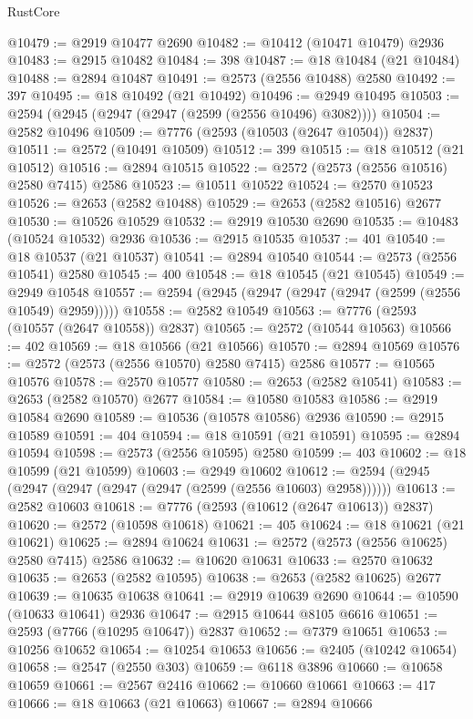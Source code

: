 \begin{lexlean}{RustCore}
\begin{coremodule}
@10479 := @2919 @10477 @2690
@10482 := @10412 (@10471 @10479) @2936
@10483 := @2915 @10482
@10484 := 398
@10487 := @18 @10484 (@21 @10484)
@10488 := @2894 @10487
@10491 := @2573 (@2556 @10488) @2580
@10492 := 397
@10495 := @18 @10492 (@21 @10492)
@10496 := @2949 @10495
@10503 := @2594 (@2945 (@2947 (@2947 (@2599 (@2556 @10496) @3082))))
@10504 := @2582 @10496
@10509 := @7776 (@2593 (@10503 (@2647 @10504)) @2837)
@10511 := @2572 (@10491 @10509)
@10512 := 399
@10515 := @18 @10512 (@21 @10512)
@10516 := @2894 @10515
@10522 := @2572 (@2573 (@2556 @10516) @2580 @7415) @2586
@10523 := @10511 @10522
@10524 := @2570 @10523
@10526 := @2653 (@2582 @10488)
@10529 := @2653 (@2582 @10516) @2677
@10530 := @10526 @10529
@10532 := @2919 @10530 @2690
@10535 := @10483 (@10524 @10532) @2936
@10536 := @2915 @10535
@10537 := 401
@10540 := @18 @10537 (@21 @10537)
@10541 := @2894 @10540
@10544 := @2573 (@2556 @10541) @2580
@10545 := 400
@10548 := @18 @10545 (@21 @10545)
@10549 := @2949 @10548
@10557 := @2594 (@2945 (@2947 (@2947 (@2947 (@2599 (@2556 @10549) @2959)))))
@10558 := @2582 @10549
@10563 := @7776 (@2593 (@10557 (@2647 @10558)) @2837)
@10565 := @2572 (@10544 @10563)
@10566 := 402
@10569 := @18 @10566 (@21 @10566)
@10570 := @2894 @10569
@10576 := @2572 (@2573 (@2556 @10570) @2580 @7415) @2586
@10577 := @10565 @10576
@10578 := @2570 @10577
@10580 := @2653 (@2582 @10541)
@10583 := @2653 (@2582 @10570) @2677
@10584 := @10580 @10583
@10586 := @2919 @10584 @2690
@10589 := @10536 (@10578 @10586) @2936
@10590 := @2915 @10589
@10591 := 404
@10594 := @18 @10591 (@21 @10591)
@10595 := @2894 @10594
@10598 := @2573 (@2556 @10595) @2580
@10599 := 403
@10602 := @18 @10599 (@21 @10599)
@10603 := @2949 @10602
@10612 := @2594 (@2945 (@2947 (@2947 (@2947 (@2947 (@2599 (@2556 @10603) @2958))))))
@10613 := @2582 @10603
@10618 := @7776 (@2593 (@10612 (@2647 @10613)) @2837)
@10620 := @2572 (@10598 @10618)
@10621 := 405
@10624 := @18 @10621 (@21 @10621)
@10625 := @2894 @10624
@10631 := @2572 (@2573 (@2556 @10625) @2580 @7415) @2586
@10632 := @10620 @10631
@10633 := @2570 @10632
@10635 := @2653 (@2582 @10595)
@10638 := @2653 (@2582 @10625) @2677
@10639 := @10635 @10638
@10641 := @2919 @10639 @2690
@10644 := @10590 (@10633 @10641) @2936
@10647 := @2915 @10644 @8105 @6616
@10651 := @2593 (@7766 (@10295 @10647)) @2837
@10652 := @7379 @10651
@10653 := @10256 @10652
@10654 := @10254 @10653
@10656 := @2405 (@10242 @10654)
@10658 := @2547 (@2550 @303)
@10659 := @6118 @3896
@10660 := @10658 @10659
@10661 := @2567 @2416
@10662 := @10660 @10661
@10663 := 417
@10666 := @18 @10663 (@21 @10663)
@10667 := @2894 @10666

\end{coremodule}
\end{lexlean}
